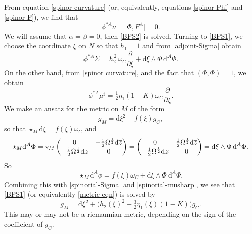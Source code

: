 \documentclass[10pt,a4paper]{amsart}
\newcommand{\1}{{\mathbb{1}}}
\def \d{\mathrm{d}}
\newcommand{\ol}{\overline}
\numberwithin{equation}{section}
\begin{document}
From equation \eqref{spinor curvature} (or, equivalently, equations \eqref{spinor Phi} and \eqref{spinor F}), we find that
\begin{equation*}
\phi^{\ast A}\nu=\bigl[\Phi,F^A\bigr]=0.
\end{equation*}
We will assume that $\alpha=\beta=0$, then \eqref{BPS2} is solved. Turning to \eqref{BPS1}, we choose the coordinate $\xi$ on $N$ so that $h_1=1$ and from \eqref{adjoint-Sigma} obtain
\begin{equation}
\label{spinorial-Sigma}
\phi^{\ast A}\Sigma = h_2^{\,2}\,\omega_C\frac{\partial}{\partial \xi} + \d\xi\wedge\Phi\,\d^A\Phi.
\end{equation}
On the other hand, from \eqref{spinor curvature}, and the fact that $(\Phi,\Phi)=1$, we obtain
\begin{equation}
\label{spinorial-musharp}
\phi^{\ast A}\mu^\sharp = \tfrac{1}{2}\eta_1(1-K)\omega_C\frac{\partial}{\partial \xi}.
\end{equation}
We make an ansatz for the metric on $M$ of the form
\begin{equation*}
g_M = \d\xi^2 + f(\xi)g_C,
\end{equation*}
so that $\star_{M} \d\xi = f(\xi)\omega_C$ and
\begin{equation*}
\star_{M} \d^A\Phi = \star_{M} \begin{pmatrix} 0&-\frac{{\rm i}}{2}\Omega^{\frac12}\d\ol{z} \\ -\frac{{\rm i}}{2}\Omega^{\frac12}\d z & 0 \end{pmatrix} = \begin{pmatrix} 0&\frac{1}{2}\Omega^{\frac12}\d\ol{z} \\ -\frac{1}{2}\Omega^{\frac12}\d z & 0 \end{pmatrix} = \d\xi\wedge\Phi\, \d^A\Phi.
\end{equation*}
So
\begin{equation*}
\star_{M} \d^A\phi = f(\xi)\omega_C + \d\xi\wedge\Phi\, \d^A\Phi.
\end{equation*}
Combining this with \eqref{spinorial-Sigma} and \eqref{spinorial-musharp}, we see that \eqref{BPS1} (or equivalently \eqref{metric-eqn}) is solved by
\begin{equation}
\label{spinorial-metric}
g_M = \d\xi^2 + \bigl(h_2(\xi)^{2}+\tfrac32\eta_1(\xi)(1-K)\bigr)g_C.
\end{equation}
This may or may not be a riemannian metric, depending on the sign of the coefficient of $g_C$.
\end{document}
